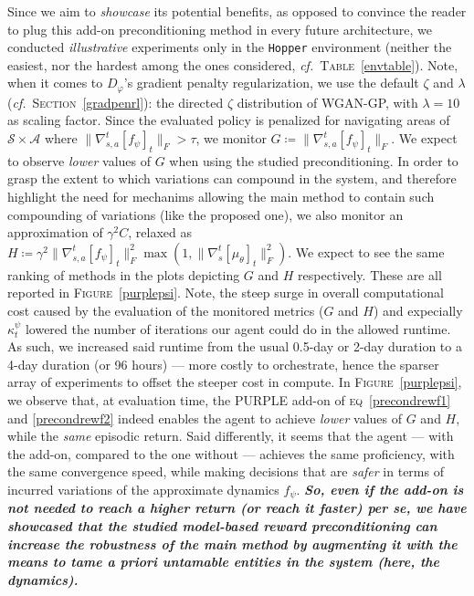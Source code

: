 Since we aim to \textit{showcase} its potential benefits, as opposed to convince the reader to plug this
add-on preconditioning method in every future architecture, we conducted \textit{illustrative} experiments
only in the \texttt{Hopper} environment (neither the easiest, nor the hardest among the ones
considered, \textit{cf.}~\textsc{Table}~\ref{envtable}).
Note, when it comes to $D_\varphi$'s gradient penalty regularization,
we use the default $\zeta$ and $\lambda$ (\textit{cf.}~\textsc{Section}~\ref{gradpenrl}):
the directed $\zeta$ distribution of WGAN-GP, with $\lambda=10$ as scaling factor.
Since the evaluated policy is penalized for navigating areas of $\mathcal{S} \times \mathcal{A}$ where
$\lVert\nabla_{s,a}^t[f_\psi]_t\rVert _F > \tau$, we monitor
$G \coloneqq \lVert\nabla_{s,a}^t[f_\psi]_t\rVert _F$.
We expect to observe \emph{lower} values of $G$ when using the studied preconditioning.
In order to grasp the extent to which variations can compound in the system,
and therefore highlight the need for mechanims allowing the main method to contain such compounding of variations
(like the proposed one),
we also monitor an approximation of $\gamma^2 C$, relaxed as
$H \coloneqq \gamma^2 \lVert\nabla_{s,a}^t[f_\psi]_t\rVert _F^2 \max (1, \lVert\nabla_s^t[\mu_\theta]_t\rVert _F^2)$.
We expect to see the same ranking of methods in the plots depicting $G$ and $H$ respectively.
These are all reported in \textsc{Figure}~\ref{purplepsi}.
Note, the steep surge in overall computational cost caused by the evaluation of the monitored metrics
($G$ and $H$) and expecially $\kappa_t^\psi$ lowered the number of iterations our agent could do in the allowed runtime.
As such, we increased said runtime from the usual 0.5-day or 2-day duration to a 4-day duration (or 96 hours)
--- more costly to orchestrate, hence the sparser array of experiments to offset the steeper cost in compute.
In \textsc{Figure}~\ref{purplepsi},
we observe that, at evaluation time,
the PURPLE add-on of \textsc{eq}~\ref{precondrewf1} and \ref{precondrewf2}
indeed enables the agent to achieve \emph{lower} values of $G$ and $H$,
while the \emph{same} episodic return.
Said differently, it seems that the agent --- with the add-on, compared to the one without ---
achieves the same proficiency, with the same convergence speed, while making decisions
that are \emph{safer} in terms of incurred variations of the approximate dynamics $f_\psi$.
\textbf{\emph{
So, even if the add-on is not needed to reach a higher return (or reach it faster) \textit{per se},
we have showcased that the studied model-based reward preconditioning can increase the robustness of the main method
by augmenting it with the means to tame \textit{a priori} untamable entities in the system (here, the dynamics).
}}
